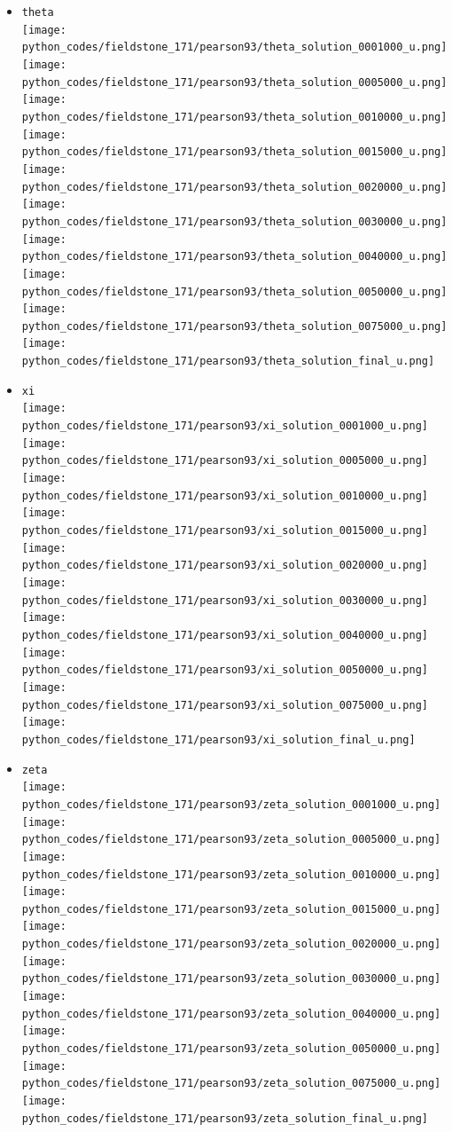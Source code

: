 \begin{itemize}
\item {\tt theta}\\
\texttt{[image: python\_codes/fieldstone\_171/pearson93/theta\_solution\_0001000\_u.png]}
\texttt{[image: python\_codes/fieldstone\_171/pearson93/theta\_solution\_0005000\_u.png]}
\texttt{[image: python\_codes/fieldstone\_171/pearson93/theta\_solution\_0010000\_u.png]}
\texttt{[image: python\_codes/fieldstone\_171/pearson93/theta\_solution\_0015000\_u.png]}
\texttt{[image: python\_codes/fieldstone\_171/pearson93/theta\_solution\_0020000\_u.png]}\\
\texttt{[image: python\_codes/fieldstone\_171/pearson93/theta\_solution\_0030000\_u.png]}
\texttt{[image: python\_codes/fieldstone\_171/pearson93/theta\_solution\_0040000\_u.png]}
\texttt{[image: python\_codes/fieldstone\_171/pearson93/theta\_solution\_0050000\_u.png]}
\texttt{[image: python\_codes/fieldstone\_171/pearson93/theta\_solution\_0075000\_u.png]}
\texttt{[image: python\_codes/fieldstone\_171/pearson93/theta\_solution\_final\_u.png]}

\item {\tt xi}\\
\texttt{[image: python\_codes/fieldstone\_171/pearson93/xi\_solution\_0001000\_u.png]}
\texttt{[image: python\_codes/fieldstone\_171/pearson93/xi\_solution\_0005000\_u.png]}
\texttt{[image: python\_codes/fieldstone\_171/pearson93/xi\_solution\_0010000\_u.png]}
\texttt{[image: python\_codes/fieldstone\_171/pearson93/xi\_solution\_0015000\_u.png]}
\texttt{[image: python\_codes/fieldstone\_171/pearson93/xi\_solution\_0020000\_u.png]}\\
\texttt{[image: python\_codes/fieldstone\_171/pearson93/xi\_solution\_0030000\_u.png]}
\texttt{[image: python\_codes/fieldstone\_171/pearson93/xi\_solution\_0040000\_u.png]}
\texttt{[image: python\_codes/fieldstone\_171/pearson93/xi\_solution\_0050000\_u.png]}
\texttt{[image: python\_codes/fieldstone\_171/pearson93/xi\_solution\_0075000\_u.png]}
\texttt{[image: python\_codes/fieldstone\_171/pearson93/xi\_solution\_final\_u.png]}

\item {\tt zeta}\\
\texttt{[image: python\_codes/fieldstone\_171/pearson93/zeta\_solution\_0001000\_u.png]}
\texttt{[image: python\_codes/fieldstone\_171/pearson93/zeta\_solution\_0005000\_u.png]}
\texttt{[image: python\_codes/fieldstone\_171/pearson93/zeta\_solution\_0010000\_u.png]}
\texttt{[image: python\_codes/fieldstone\_171/pearson93/zeta\_solution\_0015000\_u.png]}
\texttt{[image: python\_codes/fieldstone\_171/pearson93/zeta\_solution\_0020000\_u.png]}\\
\texttt{[image: python\_codes/fieldstone\_171/pearson93/zeta\_solution\_0030000\_u.png]}
\texttt{[image: python\_codes/fieldstone\_171/pearson93/zeta\_solution\_0040000\_u.png]}
\texttt{[image: python\_codes/fieldstone\_171/pearson93/zeta\_solution\_0050000\_u.png]}
\texttt{[image: python\_codes/fieldstone\_171/pearson93/zeta\_solution\_0075000\_u.png]}
\texttt{[image: python\_codes/fieldstone\_171/pearson93/zeta\_solution\_final\_u.png]}

\end{itemize}


